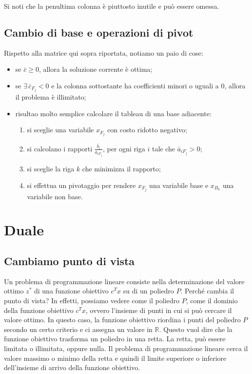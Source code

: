 \documentclass[12pt]{article}
\begin{document}
Si noti che la penultima colonna è piuttosto inutile e può essere omessa.

\subsection{Cambio di base e operazioni di pivot}

Rispetto alla matrice qui sopra riportata, notiamo un paio di cose:
\begin{itemize}
	\item se $\bar{c} \geq 0$, allora la soluzione corrente è ottima;
	\item se $\exists \, \bar{c}_{F_j} < 0$ e la colonna sottostante ha
	      coefficienti minori o uguali a $0$, allora il problema è illimitato;
	\item risultao molto semplice calcolare il tableau di una base adiacente:
	      \begin{enumerate}
		      \item si sceglie una variabile $x_{F_j}$ con costo ridotto
		            negativo;

		      \item si calcolano i rapporti $\frac{\bar{b}_i}{\bar{a}_{iF_j}}$,
		            per ogni riga $i$ tale che $\bar{a}_{iF_j} > 0$;

		      \item si sceglie la riga $k$ che minimizza il rapporto;

		      \item si effettua un pivotaggio per rendere $x_{F_j}$ una variabile
		            base e $x_{B_k}$ una variabile non base.
	      \end{enumerate}
\end{itemize}

\section{Duale}

\subsection{Cambiamo punto di vista}

Un problema di programmazione lineare consiste nella determinazione del valore
ottimo $z^*$ di una funzione obiettivo $c^Tx$ su di un poliedro $P$. Perché
cambia il punto di vista? In effetti, possiamo vedere come il poliedro $P$, come
il dominio della funzione obiettivo $c^Tx$, ovvero l'insieme di punti in cui si
può cercare il valore ottimo. In questo caso, la funzione obiettivo riordina i
punti del poliedro $P$ secondo un certo criterio e ci assegna un valore in
$\mathbb{R}$. Questo vuol dire che la funzione obiettivo trasforma un poliedro
in una retta. La retta, può essere limitata o illimitata, oppure nulla. Il
problema di programmazione lineare cerca il valore massimo o minimo della retta
e quindi il limite superiore o inferiore dell'insieme di arrivo della funzione
obiettivo.
\end{document}
